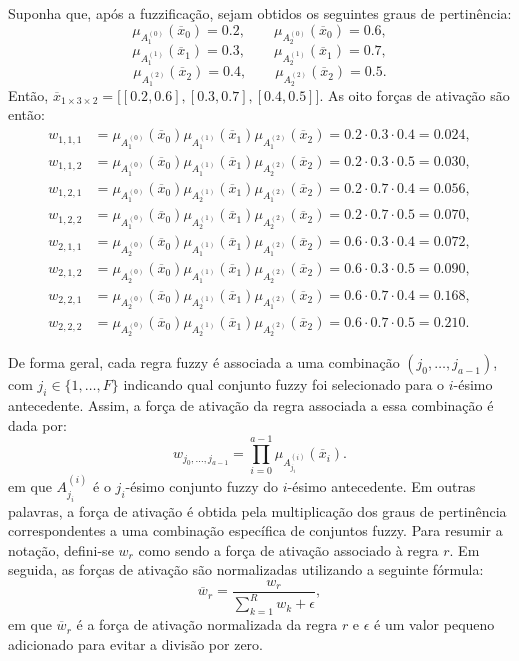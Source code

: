 Suponha que, após a fuzzificação, sejam obtidos os seguintes graus de pertinência:
$$
\mu_{A^{(0)}_1}(\overline{x}_0)=0.2, \qquad
\mu_{A^{(0)}_2}(\overline{x}_0)=0.6,
$$
$$
\mu_{A^{(1)}_1}(\overline{x}_1)=0.3, \qquad
\mu_{A^{(1)}_2}(\overline{x}_1)=0.7,
$$
$$
\mu_{A^{(2)}_1}(\overline{x}_2)=0.4, \qquad
\mu_{A^{(2)}_2}(\overline{x}_2)=0.5.
$$
Então, $\overline{x}_{1\times 3 \times 2} = \bigg[[0.2, 0.6], [0.3, 0.7], [0.4, 0.5]\bigg]$. As oito forças de ativação são então:
$$
\begin{aligned}
w_{1,1,1} &= \mu_{A^{(0)}_1}(\overline{x}_0)\mu_{A^{(1)}_1}(\overline{x}_1)\mu_{A^{(2)}_1}(\overline{x}_2)
= 0.2 \cdot 0.3 \cdot 0.4 = 0.024, \\
w_{1,1,2} &= \mu_{A^{(0)}_1}(\overline{x}_0)\mu_{A^{(1)}_1}(\overline{x}_1)\mu_{A^{(2)}_2}(\overline{x}_2)
= 0.2 \cdot 0.3 \cdot 0.5 = 0.030, \\
w_{1,2,1} &= \mu_{A^{(0)}_1}(\overline{x}_0)\mu_{A^{(1)}_2}(\overline{x}_1)\mu_{A^{(2)}_1}(\overline{x}_2)
= 0.2 \cdot 0.7 \cdot 0.4 = 0.056, \\
w_{1,2,2} &= \mu_{A^{(0)}_1}(\overline{x}_0)\mu_{A^{(1)}_2}(\overline{x}_1)\mu_{A^{(2)}_2}(\overline{x}_2)
= 0.2 \cdot 0.7 \cdot 0.5 = 0.070, \\
w_{2,1,1} &= \mu_{A^{(0)}_2}(\overline{x}_0)\mu_{A^{(1)}_1}(\overline{x}_1)\mu_{A^{(2)}_1}(\overline{x}_2)
= 0.6 \cdot 0.3 \cdot 0.4 = 0.072, \\
w_{2,1,2} &= \mu_{A^{(0)}_2}(\overline{x}_0)\mu_{A^{(1)}_1}(\overline{x}_1)\mu_{A^{(2)}_2}(\overline{x}_2)
= 0.6 \cdot 0.3 \cdot 0.5 = 0.090, \\
w_{2,2,1} &= \mu_{A^{(0)}_2}(\overline{x}_0)\mu_{A^{(1)}_2}(\overline{x}_1)\mu_{A^{(2)}_1}(\overline{x}_2)
= 0.6 \cdot 0.7 \cdot 0.4 = 0.168, \\
w_{2,2,2} &= \mu_{A^{(0)}_2}(\overline{x}_0)\mu_{A^{(1)}_2}(\overline{x}_1)\mu_{A^{(2)}_2}(\overline{x}_2)
= 0.6 \cdot 0.7 \cdot 0.5 = 0.210.
\end{aligned}
$$

De forma geral, cada regra fuzzy é associada a uma combinação $(j_0, \hdots, j_{a-1})$, com $j_i \in \{1, \dots, F\}$ indicando qual conjunto fuzzy foi selecionado para o $i$-ésimo antecedente. Assim, a força de ativação da regra associada a essa combinação é dada por:
$$
w_{j_0,\hdots,j_{a-1}} = \prod_{i=0}^{a-1} \mu_{A^{(i)}_{j_i}}(\overline{x}_i).
$$
em que $A^{(i)}_{j_i}$ é o $j_i$-ésimo conjunto fuzzy do $i$-ésimo antecedente. Em outras palavras, a força de ativação é obtida pela multiplicação dos graus de pertinência correspondentes a uma combinação específica de conjuntos fuzzy. Para resumir a notação, defini-se $w_r$ como sendo a força de ativação associado à regra $r$. Em seguida, as forças de ativação são normalizadas utilizando a seguinte fórmula:
$$
\overline{w}_r = \frac{w_r}{\sum_{k=1}^{R} w_k + \epsilon},
$$
em que $\overline{w}_r$ é a força de ativação normalizada da regra $r$ e $\epsilon$ é um valor pequeno adicionado para evitar a divisão por zero.

